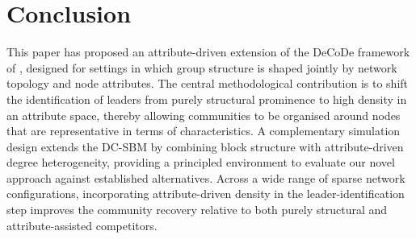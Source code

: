 \documentclass[11pt]{article}
\begin{document}
\begin{table}[bt!]
\centering
\caption{Composition of the five largest clusters (including ties) by dominant research topics. Project keywords associated with cluster leaders in bold.}
\label{tab:cluster_topic}
\end{table}

\section{Conclusion}\label{sec:conclusion}

This paper has proposed an attribute-driven extension of the DeCoDe framework of \citet{Menardi2022Density-basedNetworks}, designed for settings in which group structure is shaped jointly by network topology and node attributes. The central methodological contribution is to shift the identification of leaders from purely structural prominence to high density in an attribute space, thereby allowing communities to be organised around nodes that are representative in terms of characteristics.
A complementary simulation design extends the DC-SBM \citep{Karrer2011StochasticNetworks} by combining block structure with attribute-driven degree heterogeneity, providing a principled environment to evaluate our novel approach against established alternatives. Across a wide range of sparse network configurations, incorporating attribute-driven density in the leader-identification step improves the community recovery relative to both purely structural and attribute-assisted competitors.
\end{document}
